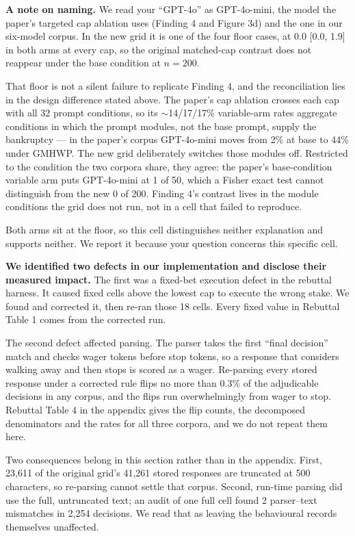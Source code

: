 \textbf{A note on naming.} We read your ``GPT-4o'' as GPT-4o-mini, the model the paper's targeted
cap ablation uses (Finding 4 and Figure 3d) and the one in our six-model corpus. In the new grid it
is one of the four floor cases, at 0.0 [0.0, 1.9] in both arms at every cap, so the original
matched-cap contrast does not reappear under the base condition at $n = 200$.

That floor is not a silent failure to replicate Finding 4, and the reconciliation lies in the
design difference stated above. The paper's cap ablation crosses each cap with all 32 prompt
conditions, so its $\sim$14/17/17\% variable-arm rates aggregate conditions in which the prompt
modules, not the base prompt, supply the bankruptcy --- in the paper's corpus GPT-4o-mini moves
from 2\% at base to 44\% under GMHWP. The new grid deliberately switches those modules off.
Restricted to the condition the two corpora share, they agree: the paper's base-condition
variable arm puts GPT-4o-mini at 1 of 50, which a Fisher exact test cannot distinguish from the
new 0 of 200. Finding 4's contrast lives in the module conditions the grid does not run, not in
a cell that failed to reproduce.

Both arms sit at the floor, so this cell distinguishes neither explanation and supports neither.
We report it because your question concerns this specific cell.

\textbf{We identified two defects in our implementation and disclose their measured impact.} The
first was a fixed-bet execution defect in the rebuttal harness. It caused fixed cells above the
lowest cap to execute the wrong stake. We found and corrected it, then re-ran those 18 cells. Every
fixed value in Rebuttal Table 1 comes from the corrected run.

The second defect affected parsing. The parser takes the first ``final decision'' match and checks
wager tokens before stop tokens, so a response that considers walking away and then stops is scored
as a wager. Re-parsing every stored response under a corrected rule flips no more than 0.3\% of the
adjudicable decisions in any corpus, and the flips run overwhelmingly from wager to stop. Rebuttal
Table 4 in the appendix gives the flip counts, the decomposed denominators and the rates for all
three corpora, and we do not repeat them here.

Two consequences belong in this section rather than in the appendix. First, 23,611 of the original
grid's 41,261 stored responses are truncated at 500 characters, so re-parsing cannot settle that
corpus. Second, run-time parsing did use the full, untruncated text; an audit of one full cell found
2 parser--text mismatches in 2,254 decisions. We read that as leaving the behavioural records
themselves unaffected.

